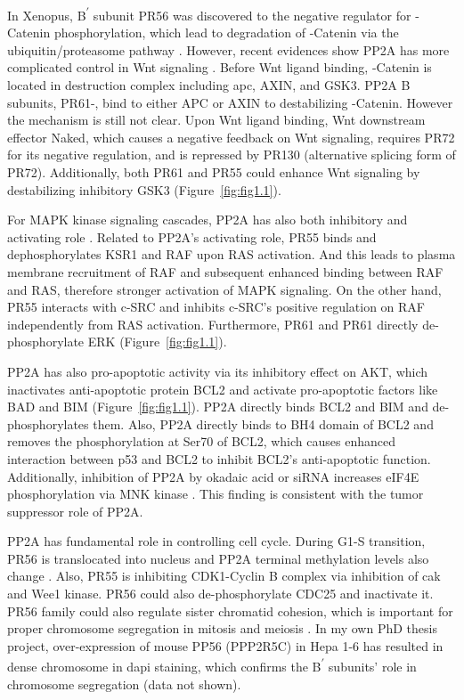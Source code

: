 In Xenopus, B\textsuperscript{$\prime$} subunit PR56\textalpha{} was discovered to the negative regulator for \textbeta-Catenin phosphorylation, which lead to degradation of \textbeta-Catenin via the ubiquitin/proteasome pathway \cite{li_protein_2001}. However, recent evidences show PP2A has more complicated control in Wnt signaling \cite{eichhorn_protein_2009}. Before Wnt ligand binding, \textbeta-Catenin is located in destruction complex including \gls{apc}, AXIN, and GSK3\textbeta{}. PP2A B subunits, PR61\textalpha{}-\textdelta{}, bind to either APC or AXIN to destabilizing \textbeta-Catenin. However the mechanism is still not clear. Upon Wnt ligand binding, Wnt downstream effector Naked, which causes a negative feedback on Wnt signaling, requires PR72 for its negative regulation, and is repressed by PR130 (alternative splicing form of PR72). Additionally, both PR61\textepsilon{} and PR55 could enhance Wnt signaling by destabilizing inhibitory GSK3\textbeta{} (Figure~\ref{fig:fig1.1}). 

For MAPK kinase signaling cascades, PP2A has also both inhibitory and activating role \cite{eichhorn_protein_2009}. Related to PP2A's activating role, PR55\textalpha{} binds and dephosphorylates KSR1 and RAF upon RAS activation. And this leads to plasma membrane recruitment of RAF and subsequent enhanced binding between RAF and RAS, therefore stronger activation of MAPK signaling. On the other hand, PR55\textgamma{} interacts with c-SRC and inhibits c-SRC's positive regulation on RAF independently from RAS activation. Furthermore, PR61\textbeta{} and PR61\textgamma{} directly de-phosphorylate ERK (Figure~\ref{fig:fig1.1}). 

PP2A has also pro-apoptotic activity via its inhibitory effect on AKT, which inactivates anti-apoptotic protein BCL2 and activate pro-apoptotic factors like BAD and BIM \cite{eichhorn_protein_2009,janssens_role_2012} (Figure~\ref{fig:fig1.1}). PP2A directly binds BCL2 and BIM and de-phosphorylates them. Also, PP2A directly binds to BH4 domain of BCL2 and removes the phosphorylation at Ser70 of BCL2, which causes enhanced interaction between p53 and BCL2 to inhibit BCL2's anti-apoptotic function. Additionally, inhibition of PP2A by okadaic acid or siRNA increases eIF4E phosphorylation via MNK kinase \cite{li_protein_2010}. This finding is consistent with the tumor suppressor role of PP2A.

PP2A has fundamental role in controlling cell cycle. During G1-S transition, PR56\textgamma{} is translocated into nucleus and PP2A terminal methylation levels also change \cite{eichhorn_protein_2009}. Also, PR55\textalpha{} is inhibiting CDK1-Cyclin B complex via inhibition of \gls{cak} and Wee1 kinase. PR56\textdelta{} could also de-phosphorylate CDC25 and inactivate it. PR56 family could also regulate sister chromatid cohesion, which is important for proper chromosome segregation in mitosis and meiosis \cite{hu_scaffold_2014,kitajima_shugoshin_2006}. In my own PhD thesis project, over-expression of mouse PP56\textgamma{} (PPP2R5C) in Hepa 1-6 has resulted in dense chromosome in \gls{dapi} staining, which confirms the B\textsuperscript{$\prime$} subunits' role in chromosome segregation (data not shown). 


